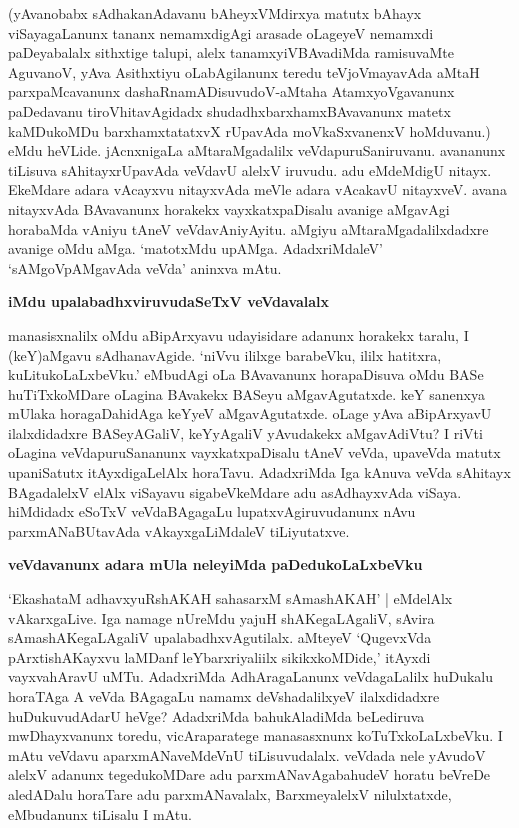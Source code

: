 (yAvanobabx sAdhakanAdavanu bAheyxVMdirxya matutx bAhayx viSayagaLanunx tananx nemamxdigAgi arasade oLageyeV nemamxdi paDeyabalalx sithxtige talupi, alelx tanamxyiVBAvadiMda ramisuvaMte AguvanoV, yAva Asithxtiyu oLabAgilanunx teredu teVjoVmayavAda aMtaH parxpaMcavanunx dashaRnamADisuvudoV-aMtaha AtamxyoVgavanunx paDedavanu tiroVhitavAgidadx shudadhxbarxhamxBAvavanunx matetx kaMDukoMDu barxhamxtatatxvX rUpavAda moVkaSxvanenxV hoMduvanu.) eMdu heVLide. jAcnxnigaLa aMtaraMgadalilx veVdapuruSaniruvanu. avananunx tiLisuva sAhitayxrUpavAda veVdavU alelxV iruvudu. adu eMdeMdigU nitayx. EkeMdare adara vAcayxvu nitayxvAda meVle adara vAcakavU nitayxveV. avana nitayxvAda BAvavanunx horakekx vayxkatxpaDisalu avanige aMgavAgi horabaMda vAniyu tAneV veVdavAniyAyitu. aMgiyu aMtaraMgadalilxdadxre avanige oMdu aMga. `matotxMdu upAMga. AdadxriMdaleV' `sAMgoVpAMgavAda veVda' aninxva mAtu.

{\bf iMdu upalabadhxviruvudaSeTxV veVdavalalx}

manasisxnalilx oMdu aBipArxyavu udayisidare adanunx horakekx taralu, I (keY)aMgavu sAdhanavAgide. `niVvu ililxge barabeVku, ililx hatitxra, kuLitukoLaLxbeVku.' eMbudAgi oLa BAvavanunx horapaDisuva oMdu BASe huTiTxkoMDare oLagina BAvakekx BASeyu aMgavAgutatxde. keY sanenxya mUlaka horagaDahidAga keYyeV aMgavAgutatxde. oLage yAva aBipArxyavU ilalxdidadxre BASeyAGaliV, keYyAgaliV yAvudakekx aMgavAdiVtu? I riVti oLagina veVdapuruSananunx vayxkatxpaDisalu tAneV veVda, upaveVda matutx upaniSatutx itAyxdigaLelAlx horaTavu. AdadxriMda Iga kAnuva veVda sAhitayx BAgadalelxV elAlx viSayavu sigabeVkeMdare adu asAdhayxvAda viSaya. hiMdidadx eSoTxV veVdaBAgagaLu lupatxvAgiruvudanunx nAvu parxmANaBUtavAda vAkayxgaLiMdaleV tiLiyutatxve.

{\bf veVdavanunx adara mUla neleyiMda paDedukoLaLxbeVku}

`EkashataM adhavxyuRshAKAH sahasarxM sAmashAKAH' | eMdelAlx vAkarxgaLive. Iga namage nUreMdu yajuH shAKegaLAgaliV, sAvira sAmashAKegaLAgaliV upalabadhxvAgutilalx. aMteyeV `QugevxVda pArxtishAKayxvu laMDanf leYbarxriyaliilx sikikxkoMDide,' itAyxdi vayxvahAravU uMTu. AdadxriMda AdhAragaLanunx veVdagaLalilx huDukalu horaTAga A veVda BAgagaLu namamx deVshadalilxyeV ilalxdidadxre huDukuvudAdarU heVge? AdadxriMda bahukAladiMda beLediruva mwDhayxvanunx toredu, vicAraparatege manasasxnunx koTuTxkoLaLxbeVku. I mAtu veVdavu aparxmANaveMdeVnU tiLisuvudalalx. veVdada nele yAvudoV alelxV adanunx tegedukoMDare adu parxmANavAgabahudeV horatu beVreDe aledADalu horaTare adu parxmANavalalx, BarxmeyalelxV nilulxtatxde, eMbudanunx tiLisalu I mAtu.

